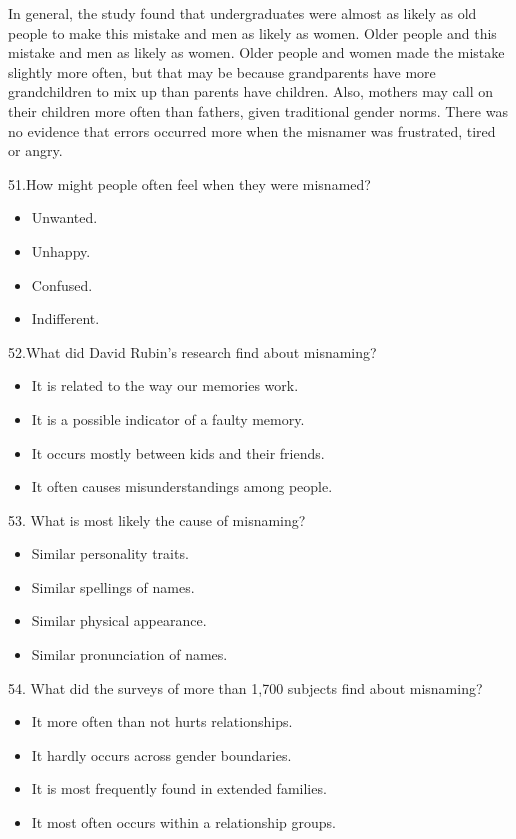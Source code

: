 \documentclass[UTF8,11pt]{ctexart}
\begin{document}
In general, the study found that undergraduates were almost as likely as old people to make this mistake and men as likely as women. Older people and this mistake and men as likely as women. Older people and women made the mistake slightly more often, but that may be because grandparents have more grandchildren to mix up than parents have children. Also, mothers may call on their children more often than fathers, given traditional gender norms. There was no evidence that errors occurred more when the misnamer was frustrated, tired or angry.


51.How might people often feel when they were misnamed?


\begin{itemize}[leftmargin=2em,itemsep=.2em,topsep=.4em]\item[A.] Unwanted.
\item[B.] Unhappy.
\item[C.] Confused.
\item[D.] Indifferent.
\end{itemize}

52.What did David Rubin’s research find about misnaming?


\begin{itemize}[leftmargin=2em,itemsep=.2em,topsep=.4em]\item[A.] It is related to the way our memories work.
\item[B.] It is a possible indicator of a faulty memory.
\item[C.] It occurs mostly between kids and their friends.
\item[D.] It often causes misunderstandings among people.
\end{itemize}

53. What is most likely the cause of misnaming?


\begin{itemize}[leftmargin=2em,itemsep=.2em,topsep=.4em]\item[A.] Similar personality traits.
\item[B.] Similar spellings of names.
\item[C.] Similar physical appearance.
\item[D.] Similar pronunciation of names.
\end{itemize}

54. What did the surveys of more than 1,700 subjects find about misnaming?


\begin{itemize}[leftmargin=2em,itemsep=.2em,topsep=.4em]\item[A.] It more often than not hurts relationships.
\item[B.] It hardly occurs across gender boundaries.
\item[C.] It is most frequently found in extended families.
\item[D.] It most often occurs within a relationship groups.
\end{itemize}
\end{document}
